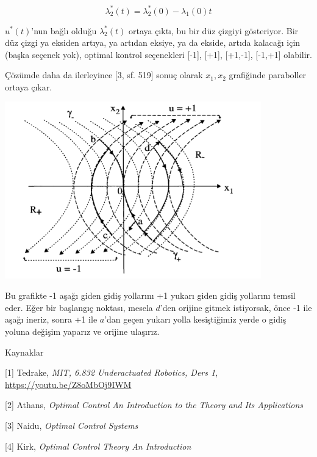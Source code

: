 \documentclass[12pt,fleqn]{article}\usepackage{../../common}
\begin{document}
$$
\lambda_2^\ast(t) = \lambda_2^\ast(0) - \lambda_1(0) t
$$

$u^\ast(t)$'nun bağlı olduğu $\lambda_2^\ast (t)$ ortaya çıktı, bu bir düz çizgiyi
gösteriyor. Bir düz çizgi ya eksiden artıya, ya artıdan eksiye, ya da
ekside, artıda kalacağı için (başka seçenek yok), optimal kontrol
seçenekleri [-1], [+1], [+1,-1], [-1,+1] olabilir.

Çözümde daha da ilerleyince [3, sf. 519] sonuç olarak $x_1,x_2$
grafiğinde paraboller ortaya çıkar.

\includegraphics[width=30em]{phy_control_07.png}

Bu grafikte -1 aşağı giden gidiş yollarını +1 yukarı giden gidiş
yollarını temsil eder. Eğer bir başlangıç noktası, mesela $d$'den
orijine gitmek istiyorsak, önce -1 ile aşağı ineriz, sonra +1 ile
$a$'dan geçen yukarı yolla kesiştiğimiz yerde o gidiş yoluna değişim
yaparız ve orijine ulaşırız.

Kaynaklar

[1] Tedrake, {\em MIT, 6.832 Underactuated Robotics, Ders 1}, \url{https://youtu.be/Z8oMbOj9IWM}

[2] Athans, {\em Optimal Control An Introduction to the Theory and Its Applications}

[3] Naidu, {\em Optimal Control Systems}

[4] Kirk, {\em Optimal Control Theory An Introduction}
\end{document}
